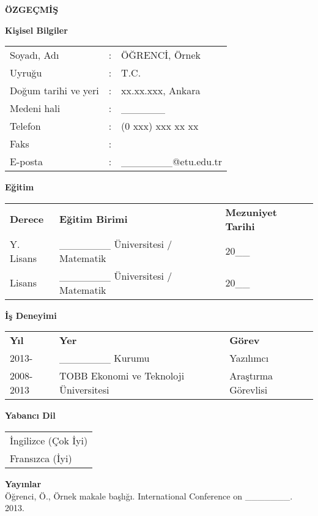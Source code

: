 \newpage
\pagestyle{plain}
\begin{center}
\textbf{ÖZGEÇMİŞ}
\end{center}
\vspace{\satbos}

\textbf{Kişisel Bilgiler}\\
\begin{tabular}{@{}lll@{}}
Soyadı, Adı & : & ÖĞRENCİ, Örnek\\
Uyruğu & : & T.C.\\
Doğum tarihi ve yeri & : & xx.xx.xxx, Ankara\\
Medeni hali & : & ______ \\
Telefon & : & (0 xxx) xxx xx xx \\
Faks & : &\\
E-posta & : & _______@etu.edu.tr\\
\end{tabular}
\vspace{\satbos}

\textbf{Eğitim}\\
\begin{tabular}{@{}lll@{}}
\textbf{Derece} & \textbf{Eğitim Birimi} & \textbf{Mezuniyet Tarihi}\\
Y. Lisans & _______ Üniversitesi / Matematik & 20__\\
Lisans & _______ Üniversitesi / Matematik & 20__\\
\end{tabular}
\vspace{\satbos}

\textbf{İş Deneyimi}\\
\begin{tabular}{@{}lll@{}}
\textbf{Yıl} & \textbf{Yer} & \textbf{Görev}\\
2013- & _______ Kurumu & Yazılımcı\\
2008-2013 & TOBB Ekonomi ve Teknoloji Üniversitesi & Araştırma Görevlisi\\
\end{tabular}
\vspace{\satbos}

\textbf{Yabancı Dil}\\
\begin{tabular}{@{}l@{}}
İngilizce (Çok İyi)\\
Fransızca (İyi)\\
\end{tabular}
\vspace{\satbos}

\textbf{Yayınlar}\\
Öğrenci, Ö., Örnek makale başlığı. International Conference on _______. 2013.\\
